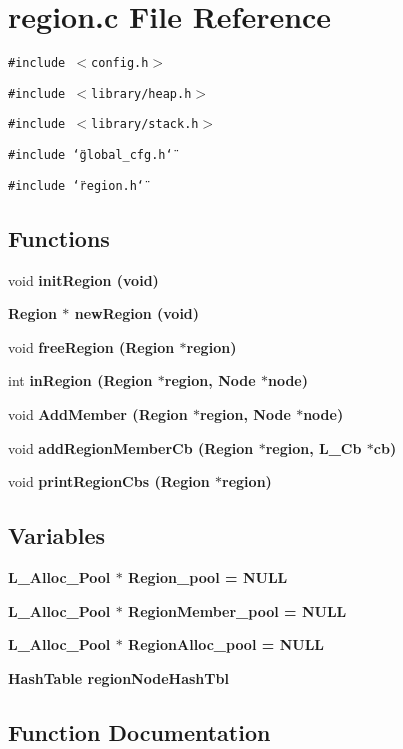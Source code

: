 \section{region.c File Reference}
\label{region_8c}
{\tt \#include $<$config.h$>$}\par
{\tt \#include $<$library/heap.h$>$}\par
{\tt \#include $<$library/stack.h$>$}\par
{\tt \#include \char`\"{}global\_\-cfg.h\char`\"{}}\par
{\tt \#include \char`\"{}region.h\char`\"{}}\par
\subsection*{Functions}
\begin{CompactItemize}
\item 
void \bf{init\-Region} (void)
\item 
\bf{Region} $\ast$ \bf{new\-Region} (void)
\item 
void \bf{free\-Region} (\bf{Region} $\ast$\bf{region})
\item 
int \bf{in\-Region} (\bf{Region} $\ast$\bf{region}, \bf{Node} $\ast$\bf{node})
\item 
void \bf{Add\-Member} (\bf{Region} $\ast$\bf{region}, \bf{Node} $\ast$\bf{node})
\item 
void \bf{add\-Region\-Member\-Cb} (\bf{Region} $\ast$\bf{region}, L\_\-Cb $\ast$cb)
\item 
void \bf{print\-Region\-Cbs} (\bf{Region} $\ast$\bf{region})
\end{CompactItemize}
\subsection*{Variables}
\begin{CompactItemize}
\item 
\bf{L\_\-Alloc\_\-Pool} $\ast$ \bf{Region\_\-pool} = \bf{NULL}
\item 
\bf{L\_\-Alloc\_\-Pool} $\ast$ \bf{Region\-Member\_\-pool} = \bf{NULL}
\item 
\bf{L\_\-Alloc\_\-Pool} $\ast$ \bf{Region\-Alloc\_\-pool} = \bf{NULL}
\item 
\bf{Hash\-Table} \bf{region\-Node\-Hash\-Tbl}
\end{CompactItemize}


\subsection{Function Documentation}
